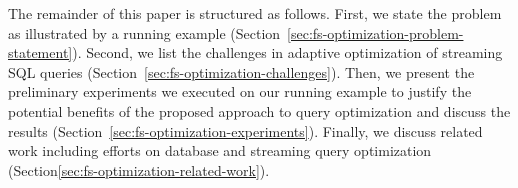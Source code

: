 The remainder of this paper is structured as follows. First, we state the problem as illustrated by a running example (Section~\ref{sec:fs-optimization-problem-statement}). 
Second, we list the challenges in adaptive optimization of streaming SQL queries (Section~\ref{sec:fs-optimization-challenges}). 
Then, we present the preliminary experiments we executed on our running example to justify the potential benefits of the proposed approach to query optimization and discuss the results (Section~\ref{sec:fs-optimization-experiments}). 
Finally, we discuss related work including efforts on database and streaming query optimization (Section\ref{sec:fs-optimization-related-work}).     
